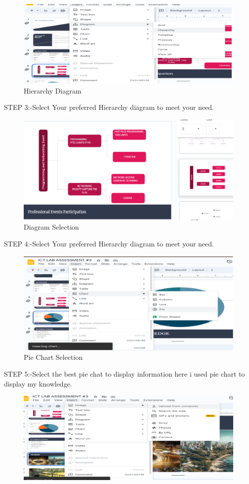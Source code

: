 \documentclass[a4paper,9pt]{article}
\begin{document}
\begin{enumerate}
	\begin{figure}[H]
		\centering
		\includegraphics[width=0.8\linewidth]{4.3.png}
		\caption{Hierarchy Diagram}
	\end{figure}
	STEP 3:-Select Your preferred Hierarchy diagram to meet your need.
	\begin{figure}[H]
		\centering
		\includegraphics[width=0.8\linewidth]{4.4.png}
		\caption{Diagram Selection}
	\end{figure}
	STEP 4:-Select Your preferred Hierarchy diagram to meet your need.
	\begin{figure}[H]
		\centering
		\includegraphics[width=0.8\linewidth]{4.5.png}
		\caption{Pie Chart Selection}
	\end{figure}
	STEP 5:-Select the best pie chat to display information here i used pie chart to display
	my knowledge.
	\begin{figure}[H]
		\centering
		\includegraphics[width=0.8\linewidth]{4.6.png}

\end{figure}
\end{enumerate}
\end{document}

